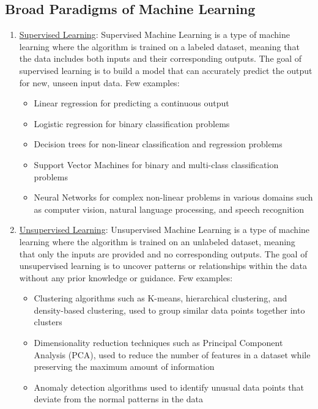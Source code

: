 \documentclass[letterpaper,11pt]{article}
\begin{document}
\subsection{Broad Paradigms of Machine Learning}
\begin{enumerate}
    \item \underline{Supervised Learning}: Supervised Machine Learning is a type of machine learning where the algorithm is trained on a labeled dataset, meaning that the data includes both inputs and their corresponding outputs. The goal of supervised learning is to build a model that can accurately predict the output for new, unseen input data. Few examples:
    \begin{itemize}
        \item Linear regression for predicting a continuous output
        \item Logistic regression for binary classification problems
        \item Decision trees for non-linear classification and regression problems
        \item Support Vector Machines for binary and multi-class classification problems
        \item Neural Networks for complex non-linear problems in various domains such as computer vision, natural language processing, and speech recognition
    \end{itemize}
    \item \underline{Unsupervised Learning}: Unsupervised Machine Learning is a type of machine learning where the algorithm is trained on an unlabeled dataset, meaning that only the inputs are provided and no corresponding outputs. The goal of unsupervised learning is to uncover patterns or relationships within the data without any prior knowledge or guidance. Few examples:
    \begin{itemize}
        \item Clustering algorithms such as K-means, hierarchical clustering, and density-based clustering, used to group similar data points together into clusters
        \item Dimensionality reduction techniques such as Principal Component Analysis (PCA), used to reduce the number of features in a dataset while preserving the maximum amount of information
        \item Anomaly detection algorithms used to identify unusual data points that deviate from the normal patterns in the data        
    \end{itemize}

\end{enumerate}
\end{document}
